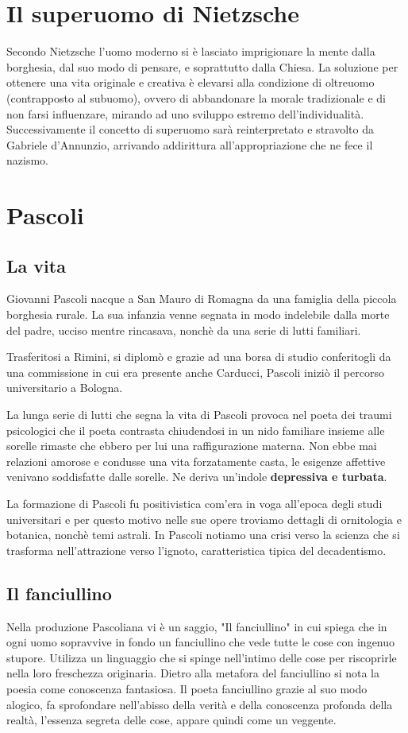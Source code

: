 \documentclass[10pt]{report}
\begin{document}
		\section{Il superuomo di Nietzsche}
		Secondo Nietzsche l’uomo moderno si è lasciato imprigionare la mente dalla borghesia, dal suo modo di pensare, e soprattutto dalla Chiesa.
		 La soluzione per ottenere una vita originale e creativa è elevarsi alla condizione di oltreuomo (contrapposto al subuomo), ovvero di abbandonare la morale tradizionale e di non farsi influenzare, mirando ad uno sviluppo estremo dell’individualità. 
		 Successivamente il concetto di superuomo sarà reinterpretato e stravolto da Gabriele d’Annunzio, arrivando addirittura all’appropriazione che ne fece il nazismo.
		\section{Pascoli}
		
		\subsection{La vita}
	
		Giovanni Pascoli nacque a San Mauro di Romagna da una famiglia della piccola borghesia rurale. La sua infanzia venne segnata in modo indelebile dalla morte del padre, ucciso mentre rincasava, nonchè da una serie di lutti familiari.
		
		Trasferitosi a Rimini, si diplomò e grazie ad una borsa di studio conferitogli da una commissione in cui era presente anche Carducci, Pascoli iniziò il percorso universitario a Bologna.
		
		La lunga serie di lutti che segna la vita di Pascoli provoca nel poeta dei traumi psicologici che il poeta contrasta chiudendosi in un nido familiare insieme alle sorelle rimaste che ebbero per lui una raffigurazione materna.
		Non ebbe mai relazioni amorose e condusse una vita forzatamente casta, le esigenze affettive venivano soddisfatte dalle sorelle.
		Ne deriva un'indole \textbf{ depressiva e turbata}.
		
		La formazione di Pascoli fu positivistica com'era in voga all'epoca degli studi universitari e per questo motivo nelle sue opere troviamo dettagli di ornitologia e botanica, nonchè temi astrali.
		In Pascoli notiamo una crisi verso la scienza che si trasforma nell'attrazione verso l'ignoto, caratteristica tipica del decadentismo.
		
		\subsection[Fanciullino]{Il fanciullino}
		Nella produzione Pascoliana vi è un saggio, "Il fanciullino" in cui spiega che in ogni uomo sopravvive in fondo un fanciullino che vede tutte le cose con ingenuo stupore.
		Utilizza un linguaggio che si spinge nell'intimo delle cose per riscoprirle nella loro freschezza originaria.
		Dietro alla metafora del fanciullino si nota la poesia come conoscenza fantasiosa.
		Il poeta fanciullino grazie al suo modo alogico, fa sprofondare nell'abisso della verità e della conoscenza profonda della realtà, l'essenza segreta delle cose, appare quindi come un veggente.
		
\end{document}

